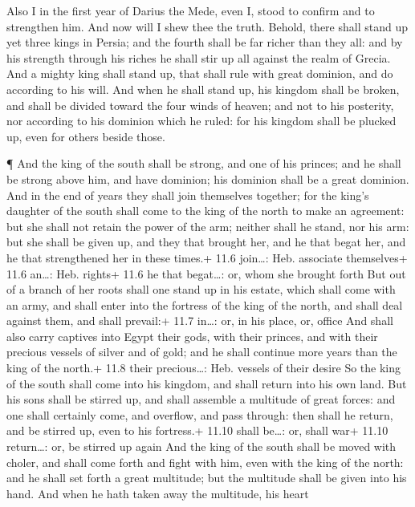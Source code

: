  Also I in the first year of Darius the Mede, even I, stood
to confirm and to strengthen him.  And now will I shew thee
the truth. Behold, there shall stand up yet three kings in Persia; and
the fourth shall be far richer than they all: and by his strength
through his riches he shall stir up all against the realm of Grecia.
 And a mighty king shall stand up, that shall rule with
great dominion, and do according to his will.  And when he
shall stand up, his kingdom shall be broken, and shall be divided toward
the four winds of heaven; and not to his posterity, nor according to his
dominion which he ruled: for his kingdom shall be plucked up, even for
others beside those.

 ¶ And the king of the south shall be strong, and one of his
princes; and he shall be strong above him, and have dominion; his
dominion shall be a great dominion.  And in the end of years
they shall join themselves together; for the king's daughter of the
south shall come to the king of the north to make an agreement: but she
shall not retain the power of the arm; neither shall he stand, nor his
arm: but she shall be given up, and they that brought her, and he that
begat her, and he that strengthened her in these times.+ 11.6
join\ldots: Heb. associate themselves+ 11.6 an\ldots: Heb. rights+ 11.6
he that begat\ldots: or, whom she brought forth  But out of
a branch of her roots shall one stand up in his estate, which shall come
with an army, and shall enter into the fortress of the king of the
north, and shall deal against them, and shall prevail:+ 11.7 in\ldots:
or, in his place, or, office  And shall also carry captives
into Egypt their gods, with their princes, and with their precious
vessels of silver and of gold; and he shall continue more years than the
king of the north.+ 11.8 their precious\ldots: Heb. vessels of their
desire  So the king of the south shall come into his
kingdom, and shall return into his own land.  But his sons
shall be stirred up, and shall assemble a multitude of great forces: and
one shall certainly come, and overflow, and pass through: then shall he
return, and be stirred up, even to his fortress.+ 11.10 shall be\ldots:
or, shall war+ 11.10 return\ldots: or, be stirred up again 
And the king of the south shall be moved with choler, and shall come
forth and fight with him, even with the king of the north: and he shall
set forth a great multitude; but the multitude shall be given into his
hand.  And when he hath taken away the multitude, his heart
